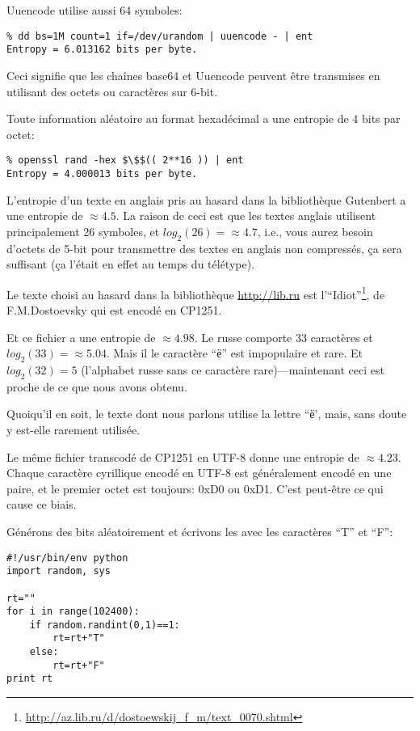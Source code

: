 Uuencode utilise aussi 64 symboles:

\begin{lstlisting}
% dd bs=1M count=1 if=/dev/urandom | uuencode - | ent
Entropy = 6.013162 bits per byte.
\end{lstlisting}

Ceci signifie que les chaînes base64 et Uuencode peuvent être transmises en utilisant
des octets ou caractères sur 6-bit.

Toute information aléatoire au format hexadécimal a une entropie de 4 bits par octet:

\begin{lstlisting}
% openssl rand -hex $\$$(( 2**16 )) | ent
Entropy = 4.000013 bits per byte.
\end{lstlisting}

L'entropie d'un texte en anglais pris au hasard dans la bibliothèque Gutenbert a
une entropie de $\approx 4.5$.
La raison de ceci est que les textes anglais utilisent principalement 26 symboles,
et $log_2(26)=\approx 4.7$, i.e., vous aurez besoin d'octets de 5-bit pour transmettre
des textes en anglais non compressés, ça sera suffisant (ça l'était en effet au temps
du télétype).

Le texte choisi au hasard dans la bibliothèque \url{http://lib.ru} est l'``Idiot''\footnote{\url{http://az.lib.ru/d/dostoewskij_f_m/text_0070.shtml}},
de F.M.Dostoevsky qui est encodé en CP1251.

Et ce fichier a une entropie de $\approx 4.98$.
Le russe comporte 33 caractères et $log_2(33)=\approx 5.04$.
Mais il le caractère ``ё'' est impopulaire et rare.
Et $log_2(32)=5$ (l'alphabet russe sans ce caractère rare)---maintenant ceci est
proche de ce que nous avons obtenu.

Quoiqu'il en soit, le texte dont nous parlons utilise la lettre ``ё', mais, sans
doute y est-elle rarement utilisée.

Le même fichier transcodé de CP1251 en UTF-8 donne une entropie de $\approx 4.23$.
Chaque caractère cyrillique encodé en UTF-8 est généralement encodé en une paire,
et le premier octet est toujours: 0xD0 ou 0xD1.
C'est peut-être ce qui cause ce biais.

Générons des bits aléatoirement et écrivons les avec les caractères ``T'' et ``F'':

\begin{lstlisting}[style=custompy]
#!/usr/bin/env python
import random, sys

rt=""
for i in range(102400):
    if random.randint(0,1)==1:
        rt=rt+"T"
    else:
        rt=rt+"F"
print rt
\end{lstlisting}

